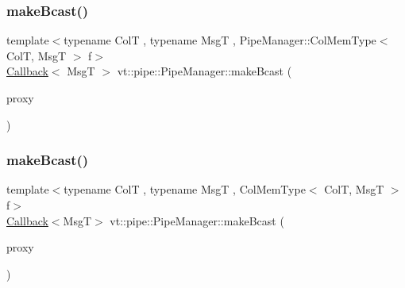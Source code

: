 \subsubsection{\texorpdfstring{make\+Bcast()}{makeBcast()}\hspace{0.1cm}{\footnotesize\ttfamily [4/6]}}
{\footnotesize\ttfamily template$<$typename ColT , typename MsgT , Pipe\+Manager\+::\+Col\+Mem\+Type$<$ Col\+T, Msg\+T $>$ f$>$ \\
\hyperlink{namespacevt_a36db99df4c973d48b1118a293fff533f}{Callback}$<$ MsgT $>$ vt\+::pipe\+::\+Pipe\+Manager\+::make\+Bcast (\begin{DoxyParamCaption}\item[{\hyperlink{structvt_1_1pipe_1_1_pipe_manager_t_l_af56c58cad882496e35f01227d4da3898}{Col\+Proxy\+Type}$<$ ColT $>$}]{proxy }\end{DoxyParamCaption})}

\mbox{\label{structvt_1_1pipe_1_1_pipe_manager_a6fb7d87f8beb2c1e80d492df47036158}} 
\subsubsection{\texorpdfstring{make\+Bcast()}{makeBcast()}\hspace{0.1cm}{\footnotesize\ttfamily [5/6]}}
{\footnotesize\ttfamily template$<$typename ColT , typename MsgT , Col\+Mem\+Type$<$ Col\+T, Msg\+T $>$ f$>$ \\
\hyperlink{namespacevt_a36db99df4c973d48b1118a293fff533f}{Callback}$<$MsgT$>$ vt\+::pipe\+::\+Pipe\+Manager\+::make\+Bcast (\begin{DoxyParamCaption}\item[{\hyperlink{structvt_1_1pipe_1_1_pipe_manager_t_l_af56c58cad882496e35f01227d4da3898}{Col\+Proxy\+Type}$<$ ColT $>$}]{proxy }\end{DoxyParamCaption})}

\mbox{\label{structvt_1_1pipe_1_1_pipe_manager_a4d561c17ce6861401a32892223e434c9}} 
